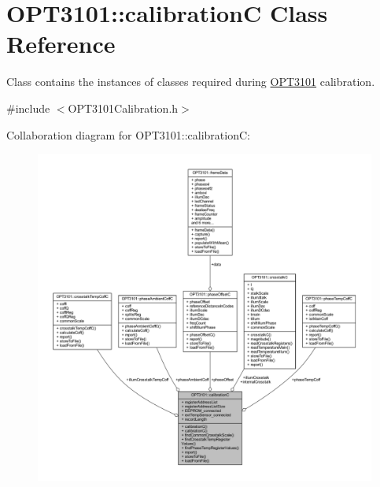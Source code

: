 \hypertarget{class_o_p_t3101_1_1calibration_c}{}\section{O\+P\+T3101\+:\+:calibrationC Class Reference}
\label{class_o_p_t3101_1_1calibration_c}


Class contains the instances of classes required during \mbox{\hyperlink{namespace_o_p_t3101}{O\+P\+T3101}} calibration.  




{\ttfamily \#include $<$O\+P\+T3101\+Calibration.\+h$>$}



Collaboration diagram for O\+P\+T3101\+:\+:calibrationC\+:\nopagebreak
\begin{figure}[H]
\begin{center}
\leavevmode
\includegraphics[width=350pt]{class_o_p_t3101_1_1calibration_c__coll__graph}
\end{center}
\end{figure}

